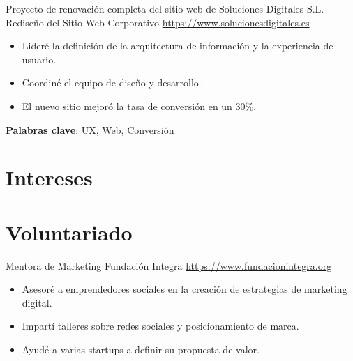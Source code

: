 \documentclass[a4paper, serif, 10pt]{moderncv}
\begin{document}
        {Proyecto de renovación completa del sitio web de Soluciones Digitales S.L.}
        {Rediseño del Sitio Web Corporativo}
        {\url{https://www.solucionesdigitales.es}}
        {}
        {\begin{itemize}
\item Lideré la definición de la arquitectura de información y la experiencia de usuario.
\item Coordiné el equipo de diseño y desarrollo.
\item El nuevo sitio mejoró la tasa de conversión en un 30\%.
\end{itemize}
\textbf{Palabras clave}: UX, Web, Conversión}
\section{Intereses}

\section{Voluntariado}

        {Mentora de Marketing}
        {Fundación Integra}
        {\url{https://www.fundacionintegra.org}}
        {}
        {\begin{itemize}
\item Asesoré a emprendedores sociales en la creación de estrategias de marketing digital.
\item Impartí talleres sobre redes sociales y posicionamiento de marca.
\item Ayudé a varias startups a definir su propuesta de valor.
\end{itemize}}
    
\end{document}
